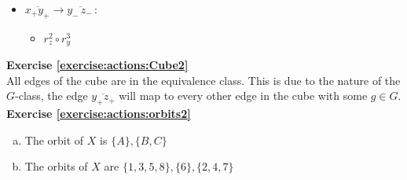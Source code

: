 \begin{enumerate}[(a)]
\begin{enumerate}[(i)]
\begin{multicols}{3}
\begin{itemize}
	 	\item
	 	$\overline{x_+y_+} \rightarrow \overline{y_-\,z_-\,}$: 
	 		\begin{itemize}
	 		\item
	 		$r_z^2 \circ r_y^3$
	 		\end{itemize}
	 		
	 	\end{itemize}
		\end{multicols}

\end{enumerate}
\end{enumerate}

\noindent\textbf{Exercise \ref{exercise:actions:Cube2}}
\\
All edges of the cube are in the equivalence class.  This is due to the nature of the $G$-class, the edge $\overline{y_+z_+}$ will map to every other edge in the cube with some $g \in G$.
\\

\noindent\textbf{Exercise \ref{exercise:actions:orbits2}}
\begin{enumerate}[(a)]
\item 
The orbit of $X$ is $\{A\}, \{B, C\}$

\item 
The orbits of $X$ are $\{1, 3, 5, 8\}, \{6\}, \{2, 4, 7\}$
\end{enumerate}

